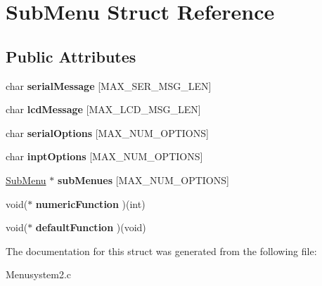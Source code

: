 \hypertarget{struct_sub_menu}{\section{Sub\+Menu Struct Reference}
\label{struct_sub_menu}
}
\subsection*{Public Attributes}
\begin{DoxyCompactItemize}
\item 
\hypertarget{struct_sub_menu_ae6c9625e12ecfaa78e17dc50b8bc254f}{char {\bfseries serial\+Message} \mbox{[}M\+A\+X\+\_\+\+S\+E\+R\+\_\+\+M\+S\+G\+\_\+\+L\+E\+N\mbox{]}}\label{struct_sub_menu_ae6c9625e12ecfaa78e17dc50b8bc254f}

\item 
\hypertarget{struct_sub_menu_abc71885724562e19aecda2973bb72867}{char {\bfseries lcd\+Message} \mbox{[}M\+A\+X\+\_\+\+L\+C\+D\+\_\+\+M\+S\+G\+\_\+\+L\+E\+N\mbox{]}}\label{struct_sub_menu_abc71885724562e19aecda2973bb72867}

\item 
\hypertarget{struct_sub_menu_a13c890f21d1d482533e7846475ef4aea}{char {\bfseries serial\+Options} \mbox{[}M\+A\+X\+\_\+\+N\+U\+M\+\_\+\+O\+P\+T\+I\+O\+N\+S\mbox{]}}\label{struct_sub_menu_a13c890f21d1d482533e7846475ef4aea}

\item 
\hypertarget{struct_sub_menu_ab4b29a6b96cfc8ff610f43a5b616fbb4}{char {\bfseries inpt\+Options} \mbox{[}M\+A\+X\+\_\+\+N\+U\+M\+\_\+\+O\+P\+T\+I\+O\+N\+S\mbox{]}}\label{struct_sub_menu_ab4b29a6b96cfc8ff610f43a5b616fbb4}

\item 
\hypertarget{struct_sub_menu_ad02c47e326be539c3b06488113fecdf9}{\hyperlink{struct_sub_menu}{Sub\+Menu} $\ast$ {\bfseries sub\+Menues} \mbox{[}M\+A\+X\+\_\+\+N\+U\+M\+\_\+\+O\+P\+T\+I\+O\+N\+S\mbox{]}}\label{struct_sub_menu_ad02c47e326be539c3b06488113fecdf9}

\item 
\hypertarget{struct_sub_menu_acf246e1c374354764c05165c27595fc7}{void($\ast$ {\bfseries numeric\+Function} )(int)}\label{struct_sub_menu_acf246e1c374354764c05165c27595fc7}

\item 
\hypertarget{struct_sub_menu_afaf0056564c062792de9bf9734bbbedf}{void($\ast$ {\bfseries default\+Function} )(void)}\label{struct_sub_menu_afaf0056564c062792de9bf9734bbbedf}

\end{DoxyCompactItemize}


The documentation for this struct was generated from the following file\+:\begin{DoxyCompactItemize}
\item 
Menusystem2.\+c\end{DoxyCompactItemize}
